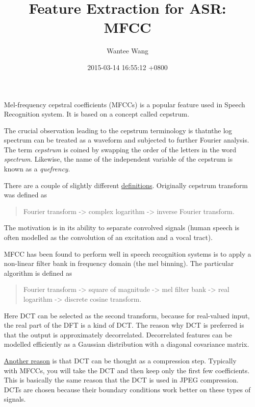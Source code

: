 \documentclass[]{article}
\title{Feature Extraction for ASR: MFCC}
\author{Wantee Wang}
\date{2015-03-14 16:55:12 +0800}
\begin{document}
\maketitle

Mel-frequency cepstral coefficients (MFCCs) is a popular feature used in
Speech Recognition system. It is based on a concept called cepstrum.

The crucial observation leading to the cepstrum terminology is thatnthe
log spectrum can be treated as a waveform and subjected to further
Fourier analysis. The term \emph{cepstrum} is coined by swapping the
order of the letters in the word \emph{spectrum}. Likewise, the name of
the independent variable of the cepstrum is known as a \emph{quefrency}.

There are a couple of slightly different
\href{http://dsp.stackexchange.com/questions/13/what-is-the-difference-between-a-fourier-transform-and-a-cosine-transform}{definitions}.
Originally cepstrum\cite{oppenheim1968homomorphic} transform was defined
as

\begin{quote}
Fourier transform -\textgreater{} complex logarithm -\textgreater{}
inverse Fourier transform.
\end{quote}

The motivation is in its ability to separate convolved signals (human
speech is often modelled as the convolution of an excitation and a vocal
tract).

MFCC has been found to perform well in speech recognition systems is to
apply a non-linear filter bank in frequency domain (the mel binning).
The particular algorithm\cite{davis1980comparison} is defined as

\begin{quote}
Fourier transform -\textgreater{} square of magnitude -\textgreater{}
mel filter bank -\textgreater{} real logarithm -\textgreater{} discrete
cosine transform.
\end{quote}

Here DCT can be selected as the second transform, because for
real-valued input, the real part of the DFT is a kind of DCT. The reason
why DCT is preferred is that the output is approximately decorrelated.
Decorrelated features can be modelled efficiently as a Gaussian
distribution with a diagonal covariance matrix.

\href{http://dsp.stackexchange.com/questions/31/how-do-i-interpret-the-dct-step-in-the-mfcc-extraction-process}{Another
reason} is that DCT can be thought as a compression step. Typically with
MFCCs, you will take the DCT and then keep only the first few
coefficients. This is basically the same reason that the DCT is used in
JPEG compression. DCTs are chosen because their boundary conditions work
better on these types of signals.
\end{document}

